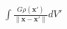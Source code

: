 \documentclass[preview]{standalone}
\begin{document}
\begin{align*}
\int\frac{G\rho(\mathbf x')}{\|\mathbf x-\mathbf x'\|} dV'
\end{align*}
\end{document}
